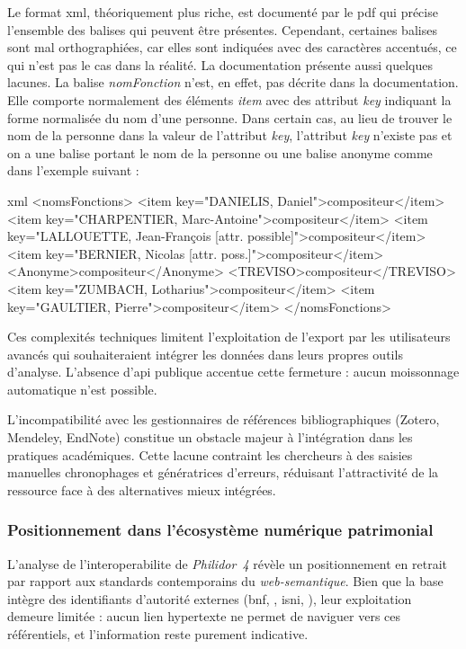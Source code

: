 Le format \gls{xml}, théoriquement plus riche, est documenté par le \gls{pdf}  qui précise l'ensemble des balises qui peuvent être présentes. Cependant, certaines balises sont mal orthographiées, car elles sont indiquées avec des caractères accentués, ce qui n'est pas le cas dans la réalité. La documentation présente aussi quelques lacunes. La balise \textit{nomFonction} n'est, en effet, pas décrite dans la documentation. Elle comporte normalement des éléments \textit{item} avec des attribut \textit{key} indiquant la forme normalisée du nom d'une personne. Dans certain cas, au lieu de trouver le nom de la personne dans la valeur de l'attribut \textit{key}, l'attribut \textit{key} n'existe pas et on a une balise portant le nom de la personne ou une balise anonyme comme dans l'exemple suivant :

\begin{codeblock}{xml}
<nomsFonctions>
    <item key="DANIELIS, Daniel">compositeur</item>
    <item key="CHARPENTIER, Marc-Antoine">compositeur</item>
    <item key="LALLOUETTE, Jean-François [attr. possible]">compositeur</item>
    <item key="BERNIER, Nicolas [attr. poss.]">compositeur</item>
    <Anonyme>compositeur</Anonyme>
    <TREVISO>compositeur</TREVISO>
    <item key="ZUMBACH, Lotharius">compositeur</item>
    <item key="GAULTIER, Pierre">compositeur</item>
</nomsFonctions>
\end{codeblock}

Ces complexités techniques limitent l'exploitation de l'export par les utilisateurs avancés qui souhaiteraient intégrer les données dans leurs propres outils d'analyse. L'absence d'\gls{api} publique accentue cette fermeture : aucun moissonnage automatique n'est possible.

L'incompatibilité avec les gestionnaires de références bibliographiques (Zotero, Mendeley, EndNote) constitue un obstacle majeur à l'intégration dans les pratiques académiques. Cette lacune contraint les chercheurs à des saisies manuelles chronophages et génératrices d'erreurs, réduisant l'attractivité de la ressource face à des alternatives mieux intégrées.

\subsubsection{Positionnement dans l'écosystème numérique patrimonial}

L'analyse de l'\gls{interoperabilite} de \textit{Philidor~4} révèle un positionnement en retrait par rapport aux standards contemporains du \textit{\gls{web-semantique}}. Bien que la base intègre des identifiants d'autorité externes (\gls{bnf}, , \gls{isni}, ), leur exploitation demeure limitée : aucun lien hypertexte ne permet de naviguer vers ces référentiels, et l'information reste purement indicative.

